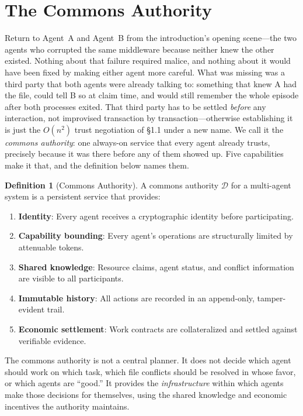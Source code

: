 \documentclass[11pt,a4paper]{article}
\theoremstyle{definition}
\newtheorem{definition}{Definition}[section]
\theoremstyle{remark}
\begin{document}
\section{The Commons Authority}\label{sec:commons}
Return to Agent~A and Agent~B from the introduction's opening scene---the two agents who corrupted the same middleware because neither knew the other existed. Nothing about that failure required malice, and nothing about it would have been fixed by making either agent more careful. What was missing was a third party that both agents were already talking to: something that knew A had the file, could tell B so at claim time, and would still remember the whole episode after both processes exited.
That third party has to be settled \emph{before} any interaction, not improvised transaction by transaction---otherwise establishing it is just the $O(n^2)$ trust negotiation of \S1.1 under a new name. We call it the \emph{commons authority}: one always-on service that every agent already trusts, precisely because it was there before any of them showed up. Five capabilities make it that, and the definition below names them.
\begin{definition}[Commons Authority]\label{def:commons}
\setlength{\parskip}{4pt plus 1pt}
A commons authority $\mathcal{D}$ for a multi-agent system is a persistent service that provides:
\begin{enumerate}[nosep]
  \item \textbf{Identity}: Every agent receives a cryptographic identity before participating.
\item \textbf{Capability bounding}: Every agent's operations are structurally limited by attenuable tokens.
\item \textbf{Shared knowledge}: Resource claims, agent status, and conflict information are visible to all participants.
  \item \textbf{Immutable history}: All actions are recorded in an append-only, tamper-evident trail.
  \item \textbf{Economic settlement}: Work contracts are collateralized and settled against verifiable evidence.
\end{enumerate}
The commons authority is not a central planner. It does not decide which agent should work on which task, which file conflicts should be resolved in whose favor, or which agents are ``good.'' It provides the \emph{infrastructure} within which agents make those decisions for themselves, using the shared knowledge and economic incentives the authority maintains.
\end{definition}
\end{document}
